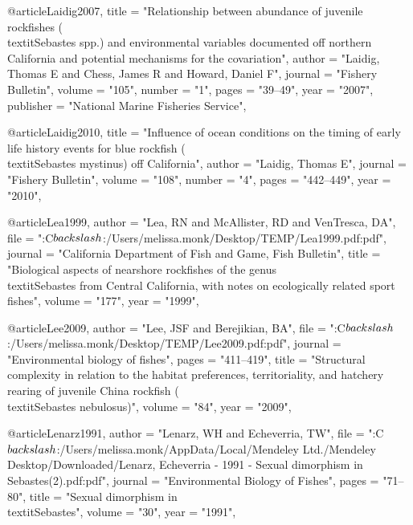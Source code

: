 {@article{Laidig2007,
    title = "{Relationship between abundance of juvenile rockfishes (\\textit{{{Sebastes}}} spp.) and environmental variables documented off northern California and potential mechanisms for the covariation}",
    author = "{Laidig, Thomas E and Chess, James R and Howard, Daniel F}",
    journal = "{Fishery Bulletin}",
    volume = "{105}",
    number = "{1}",
    pages = "{39--49}",
    year = "{2007}",
    publisher = "{National Marine Fisheries Service}",
}

@article{Laidig2010,
    title = "{Influence of ocean conditions on the timing of early life history events for blue rockfish (\\textit{{{Sebastes}} mystinus}) off California}",
    author = "{Laidig, Thomas E}",
    journal = "{Fishery Bulletin}",
    volume = "{108}",
    number = "{4}",
    pages = "{442--449}",
    year = "{2010}",
}

@article{Lea1999,
    author = "{Lea, RN and McAllister, RD and VenTresca, DA}",
    file = "{:C$\\backslash$:/Users/melissa.monk/Desktop/TEMP/Lea1999.pdf:pdf}",
    journal = "{California Department of Fish and Game, Fish Bulletin}",
    title = "{{Biological aspects of nearshore rockfishes of the genus \\textit{{Sebastes}} from {Central} {California}, with notes on ecologically related sport fishes}}",
    volume = "{177}",
    year = "{1999}",
}

@article{Lee2009,
    author = "{Lee, JSF and Berejikian, BA}",
    file = "{:C$\\backslash$:/Users/melissa.monk/Desktop/TEMP/Lee2009.pdf:pdf}",
    journal = "{Environmental biology of fishes}",
    pages = "{411--419}",
    title = "{{Structural complexity in relation to the habitat preferences, territoriality, and hatchery rearing of juvenile China rockfish (\\textit{{Sebastes} nebulosus})}}",
    volume = "{84}",
    year = "{2009}",
}

@article{Lenarz1991,
    author = "{Lenarz, WH and Echeverria, TW}",
    file = "{:C$\\backslash$:/Users/melissa.monk/AppData/Local/Mendeley Ltd./Mendeley Desktop/Downloaded/Lenarz, Echeverria - 1991 - Sexual dimorphism in Sebastes(2).pdf:pdf}",
    journal = "{Environmental Biology of Fishes}",
    pages = "{71--80}",
    title = "{{Sexual dimorphism in \\textit{{Sebastes}}}}",
    volume = "{30}",
    year = "{1991}",
}

}
